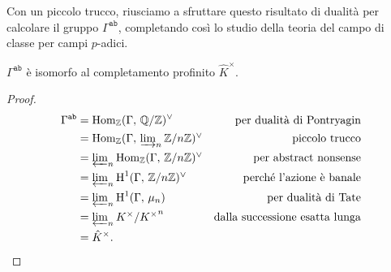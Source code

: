 Con un piccolo trucco, riusciamo a sfruttare questo risultato di dualità per calcolare il gruppo $ \Gamma^\texttt{ab} $, completando così lo studio della teoria del campo di classe per campi $ p $-adici.

\begin{corollary}
	$ \Gamma^\mathtt{ab} $ è isomorfo al completamento profinito $ \hat{K}^\times $.
\end{corollary}
\begin{proof}
	\begin{align*}
	\Gamma^\mathtt{ab}
	& = \operatorname{Hom}_{\mathbb{Z}}(\Gamma,\, \mathbb{Q}/\mathbb{Z})^\vee & \text{per dualità di Pontryagin} \\[0.1em]
	& = \operatorname{Hom}_{\mathbb{Z}}(\Gamma,\, \textstyle\varinjlim_n \mathbb{Z}/n\mathbb{Z})^\vee & \text{piccolo trucco}\\ 
	& = \textstyle\varprojlim_n \operatorname{Hom}_{\mathbb{Z}}(\Gamma,\, \mathbb{Z}/n\mathbb{Z})^\vee & \text{per abstract nonsense} \\
	& = \textstyle\varprojlim_n \operatorname{H}^1(\Gamma,\, \mathbb{Z}/n\mathbb{Z})^\vee & \text{perché l'azione è banale} \\
	& = \textstyle\varprojlim_n \operatorname{H}^1(\Gamma,\, \mu_n) & \text{per dualità di Tate} \\
	& = \textstyle\varprojlim_n K^\times / {K^\times}^n & \text{dalla successione esatta lunga} \\
	& = \hat{K}^\times. 
	\end{align*}
\end{proof}
